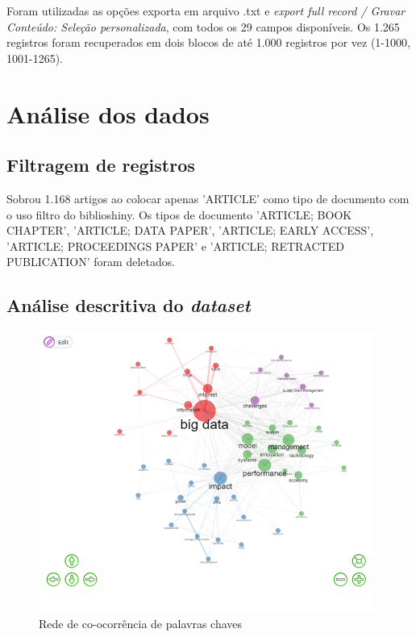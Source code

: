 Foram utilizadas as opções exporta em arquivo .txt e \textit{export full record / Gravar Conteúdo: Seleção personalizada}, com todos os 29 campos disponíveis. Os 1.265 registros foram recuperados em dois blocos de até 1.000 registros por vez (1-1000, 1001-1265).




\section{Análise dos dados}

\subsection{Filtragem de registros}

Sobrou 1.168 artigos ao colocar apenas 'ARTICLE' como tipo de documento com o uso filtro do biblioshiny. Os tipos de documento 'ARTICLE; BOOK CHAPTER', 'ARTICLE; DATA PAPER', 'ARTICLE; EARLY ACCESS', 'ARTICLE; PROCEEDINGS PAPER' e 'ARTICLE; RETRACTED PUBLICATION' foram deletados.



\subsection{Análise descritiva do \textit{dataset}} 


\begin{figure}[ht]
    \centering
    \includegraphics[width=11cm]{experiments/Tong00020/PesquisaBibliometrica/Conceptual Structure/MASSA@Tong00020-Co-occurrence Network}
    \caption{Rede de co-ocorrência de palavras chaves}
    \label{fig:rede}
\end{figure}

